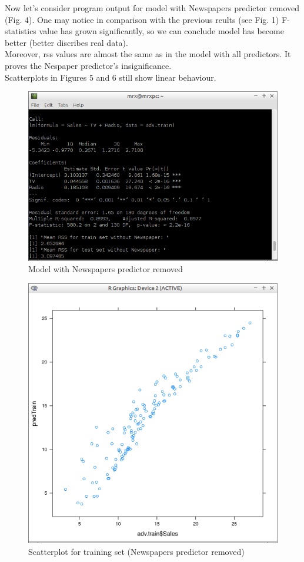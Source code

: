 \documentclass[10pt,a4paper]{article}
\begin{document}
Now let's consider program output for model with Newspapers predictor removed (Fig. 4). One may notice in comparison with the previous reults (see Fig. 1) F-statistics value has grown significantly, so we can conclude model has become better (better discribes real data).\\
Moreover, rss values are almost the same as in the model with all predictors. It proves the Nespaper predictor's insignificance.\\
Scatterplots in Figures 5 and 6 still show linear behaviour.\\

\begin{figure}[H]
\centering
\includegraphics[width=140mm]{figures/noNews.png}
\caption{Model with Newspapers predictor removed \label{overflow}}
\end{figure}

\begin{figure}[H]
\centering
\includegraphics[width=140mm]{figures/pltNoNewsTrain.png}
\caption{Scatterplot for training set (Newspapers predictor removed) \label{overflow}}
\end{figure}
\end{document}
